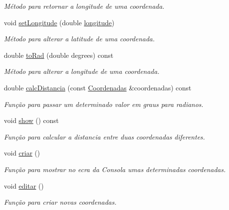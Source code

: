 \begin{DoxyCompactItemize}
\begin{DoxyCompactList}\small\item\em Método para retornar a longitude de uma coordenada. \end{DoxyCompactList}\item 
void \hyperlink{class_coordenadas_af03ec9230d72b041265a9cbcf17a0369}{set\+Longitude} (double \hyperlink{class_coordenadas_a328c0d572b3a7d47bfbd866f5d6d6489}{longitude})
\begin{DoxyCompactList}\small\item\em Método para alterar a latitude de uma coordenada. \end{DoxyCompactList}\item 
double \hyperlink{class_coordenadas_a24cb37fe0c7b21e2cc1f4c4353119d4f}{to\+Rad} (double degrees) const 
\begin{DoxyCompactList}\small\item\em Método para alterar a longitude de uma coordenada. \end{DoxyCompactList}\item 
double \hyperlink{class_coordenadas_ab64cdc4dd54abd1eb0e8fa8b031c475f}{calc\+Distancia} (const \hyperlink{class_coordenadas}{Coordenadas} \&coordenadas) const 
\begin{DoxyCompactList}\small\item\em Função para passar um determinado valor em graus para radianos. \end{DoxyCompactList}\item 
void \hyperlink{class_coordenadas_ac970d558f2fac57dbe0f34c4a132d110}{show} () const 
\begin{DoxyCompactList}\small\item\em Função para calcular a distancia entre duas coordenadas diferentes. \end{DoxyCompactList}\item 
void \hyperlink{class_coordenadas_a9b1c73edfba7e5c4e0c6cae72174633c}{criar} ()
\begin{DoxyCompactList}\small\item\em Função para mostrar no ecra da Consola umas determinadas coordenadas. \end{DoxyCompactList}\item 
void \hyperlink{class_coordenadas_ad77fe69d9094889ae677bfa87459de3f}{editar} ()
\begin{DoxyCompactList}\small\item\em Função para criar novas coordenadas. \end{DoxyCompactList}\item 

\end{DoxyCompactItemize}
